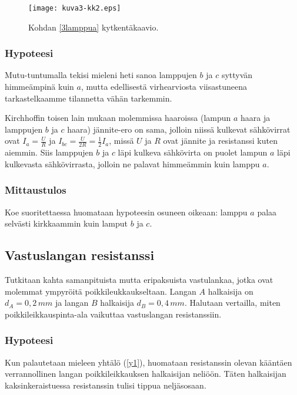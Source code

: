 \documentclass[a4paper,11pt]{article}
\begin{document}
{\begin{figure}[!htb]
    \centering
    \texttt{[image: kuva3-kk2.eps]}
    \caption{Kohdan \ref{3lamppua} kytkentäkaavio.}
    \label{fig:kk2}
\end{figure}

\subsubsection{Hypoteesi}

Mutu-tuntumalla tekisi mieleni heti sanoa lamppujen $b$ ja $c$ syttyvän himmeämpinä kuin $a$, mutta edellisestä virhearviosta viisastuneena tarkastelkaamme tilannetta vähän tarkemmin.

Kirchhoffin toisen lain mukaan molemmissa haaroissa (lampun $a$ haara ja lamppujen $b$ ja $c$ haara) jännite-ero on sama, jolloin niissä kulkevat sähkövirrat ovat $I_a=\frac{U}{R}$ ja $I_{bc}=\frac{U}{2R}=\frac{1}{2}I_a$, missä $U$ ja $R$ ovat jännite ja resistanssi kuten aiemmin. Siis lamppujen $b$ ja $c$ läpi kulkeva sähkövirta on puolet lampun $a$ läpi kulkevasta sähkövirrasta, jolloin ne palavat himmeämmin kuin lamppu $a$.

\subsubsection{Mittaustulos}

Koe suoritettaessa huomataan hypoteesin osuneen oikeaan: lamppu $a$ palaa selvästi kirkkaammin kuin lamput $b$ ja $c$.

\subsection{Vastuslangan resistanssi}
\label{lanka1}

Tutkitaan kahta samanpituista mutta eripaksuista vastulankaa, jotka ovat molemmat ympyröitä poikkileukkaukseltaan. Langan $A$ halkaisija on $d_A=0,2\,mm$ ja langan $B$ halkaisija $d_B=0,4\,mm$. Halutaan vertailla, miten poikkileikkauspinta-ala vaikuttaa vastuslangan resistanssiin.

\subsubsection{Hypoteesi}

Kun palautetaan mieleen yhtälö (\ref{y1}), huomataan resistanssin olevan kääntäen verrannollinen langan poikkileikkauksen halkaisijan neliöön. Täten halkaisijan kaksinkeraistuessa resistanssin tulisi tippua neljäsosaan.

}
\end{document}
